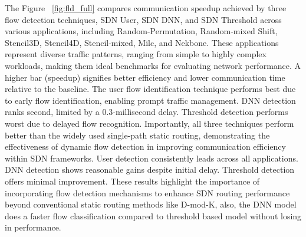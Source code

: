 The Figure ~\ref{fig:fld_full} compares communication speedup achieved by three flow detection techniques, SDN User, SDN DNN, and SDN Threshold across various applications, including Random-Permutation, Random-mixed Shift, Stencil3D, Stencil4D, Stencil-mixed, Milc, and Nekbone. These applications represent diverse traffic patterns, ranging from simple to highly complex workloads, making them ideal benchmarks for evaluating network performance.  A higher bar (speedup) signifies better efficiency and lower communication time relative to the baseline. The user flow identification technique performs best due to early flow identification, enabling prompt traffic management. DNN detection ranks second, limited by a 0.3-millisecond delay. Threshold detection performs worst due to delayed flow recognition. Importantly, all three techniques perform better than the widely used single-path static routing, demonstrating the effectiveness of dynamic flow detection in improving communication efficiency within SDN frameworks. User detection consistently leads across all applications. DNN detection shows reasonable gains despite initial delay. Threshold detection offers minimal improvement. These results highlight the importance of incorporating flow detection mechanisms to enhance SDN routing performance beyond conventional static routing methods like D-mod-K, also, the DNN model does a faster flow classification compared to threshold based model without losing in performance.


